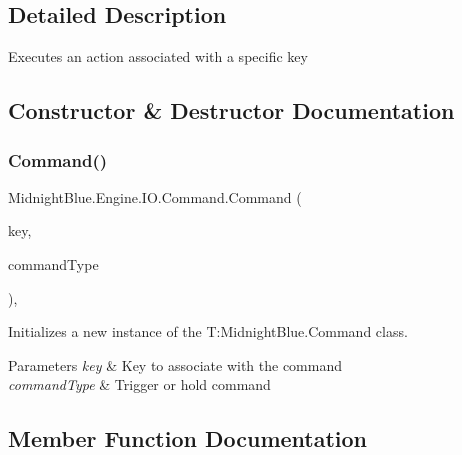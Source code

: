 \subsection{Detailed Description}
Executes an action associated with a specific key 



\subsection{Constructor \& Destructor Documentation}
\hypertarget{class_midnight_blue_1_1_engine_1_1_i_o_1_1_command_a5f50fc0c3fb129b6d94d0f78a75a2cf2}{}\label{class_midnight_blue_1_1_engine_1_1_i_o_1_1_command_a5f50fc0c3fb129b6d94d0f78a75a2cf2} 
\subsubsection{\texorpdfstring{Command()}{Command()}}
{\footnotesize\ttfamily Midnight\+Blue.\+Engine.\+I\+O.\+Command.\+Command (\begin{DoxyParamCaption}\item[{Keys}]{key,  }\item[{\hyperlink{namespace_midnight_blue_1_1_engine_1_1_i_o_a8bc3f159399ecadd590f7df1b54354b0}{Command\+Type}}]{command\+Type }\end{DoxyParamCaption})\hspace{0.3cm}{\ttfamily [inline]}, {\ttfamily [protected]}}



Initializes a new instance of the T\+:\+Midnight\+Blue.\+Command class. 


\begin{DoxyParams}{Parameters}
{\em key} & Key to associate with the command\\
\hline
{\em command\+Type} & Trigger or hold command\\
\hline
\end{DoxyParams}


\subsection{Member Function Documentation}
\hypertarget{class_midnight_blue_1_1_engine_1_1_i_o_1_1_command_ae806e7b2cab794940726b3329b776588}{}\label{class_midnight_blue_1_1_engine_1_1_i_o_1_1_command_ae806e7b2cab794940726b3329b776588} 
